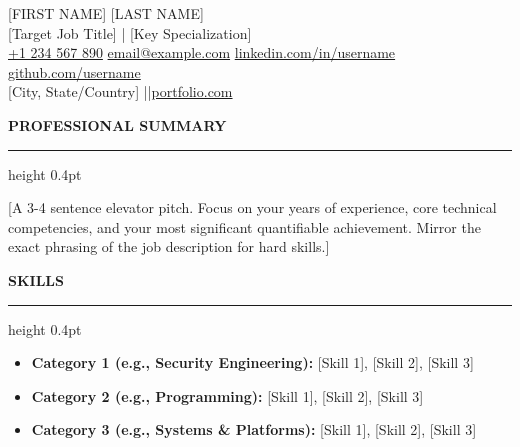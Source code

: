 \documentclass[a4paper,10pt]{article}
\newcommand{\mysection}[1]{%
  \vspace{0.3ex}
  {\bfseries\scshape\color{myblue} #1}\enspace%
  \leaders\hrule height 0.4pt\hfill\kern0pt
  \vspace{-0.2em}
}
\begin{document}
\begin{center}
    {\LARGE\scshape\color{myblue} [FIRST NAME] [LAST NAME]}\\[0.15em]
    {\normalsize [Target Job Title] | [Key Specialization]}\\[0.25em]
    \href{tel:+1234567890}{+1 234 567 890} \quad
    \href{mailto:email@example.com}{email@example.com} \quad
    \href{https://linkedin.com/in/username}{linkedin.com/in/username} \quad
    \href{https://github.com/username}{github.com/username}\\
    {[City, State/Country]} \enspace| \enspace|\enspace \href{https://portfolio.com}{portfolio.com}
\end{center}

\mysection{PROFESSIONAL SUMMARY}

[A 3-4 sentence elevator pitch. Focus on your years of experience, core technical competencies, and your most significant quantifiable achievement. Mirror the exact phrasing of the job description for hard skills.]

\mysection{SKILLS}
\begin{itemize}
    \item \textbf{Category 1 (e.g., Security Engineering):} [Skill 1], [Skill 2], [Skill 3]
    \item \textbf{Category 2 (e.g., Programming):} [Skill 1], [Skill 2], [Skill 3]
    \item \textbf{Category 3 (e.g., Systems \& Platforms):} [Skill 1], [Skill 2], [Skill 3]
\end{itemize}
\end{document}
